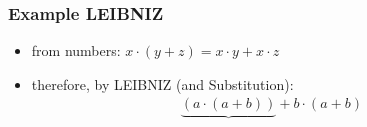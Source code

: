 \begin{multicols}{2}
\subsubsection{Example LEIBNIZ}
\begin{itemize}
  \item from numbers: $x \cdot (y + z) = x \cdot y + x \cdot z$
  \item therefore, by LEIBNIZ (and Substitution):\\
  \begin{align}
    \underbrace{(a \cdot (a + b))} + b \cdot (a + b)
  \end{align}
\end{itemize}











\end{multicols}
